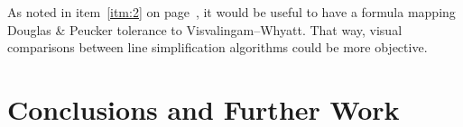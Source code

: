 \documentclass[a4paper]{article}
\newcommand{\DP}{Douglas \& Peucker}
\newcommand{\VW}{Visvalingam--Whyatt}
\begin{document}
As noted in item~\ref{itm:2} on page~\pageref{itm:2}, it would be useful to
have a formula mapping {\DP} tolerance to {\VW}. That way, visual comparisons
between line simplification algorithms could be more objective.

\section{Conclusions and Further Work}
\label{sec:conclusions_and_further_work}

\printbibliography
\end{document}
